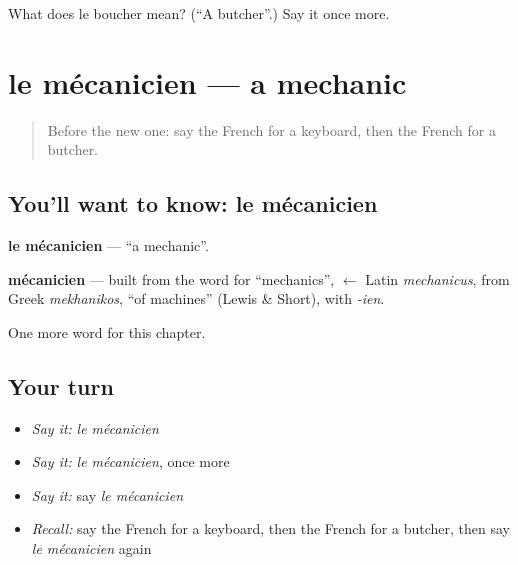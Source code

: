 \begin{tcolorbox}[breakable,colback=teal!4,colframe=teal!35!black,title={Before you move on}]
What does le boucher mean? (\textquotedblleft{}A butcher\textquotedblright{}.) Say it once more.
\end{tcolorbox}
\section[le mécanicien]{le mécanicien — a mechanic}

\label{lesson:FR-C196-mecanicien}



\begin{quote}
Before the new one: say the French for a keyboard, then the French for a butcher.
\end{quote}

\subsection*{You'll want to know: le mécanicien}
\textbf{le mécanicien} — \textquotedblleft{}a mechanic\textquotedblright{}.

\begin{cousinweb}
\textbf{mécanicien} — built from the word for \textquotedblleft{}mechanics\textquotedblright{}, $\leftarrow$ Latin \emph{mechanicus}, from Greek \emph{mekhanikos}, \textquotedblleft{}of machines\textquotedblright{} (Lewis \& Short), with \emph{-ien}.
\end{cousinweb}

\begin{grammarlens}[title={What you've built}]
One more word for this chapter.
\end{grammarlens}

\subsection*{Your turn}
\begin{itemize}
\raggedright
  \item \emph{Say it:} \emph{le mécanicien}
  \item \emph{Say it:} \emph{le mécanicien}, once more
  \item \emph{Say it:} say \emph{le mécanicien}
  \item \emph{Recall:} say the French for a keyboard, then the French for a butcher, then say \emph{le mécanicien} again
\end{itemize}

